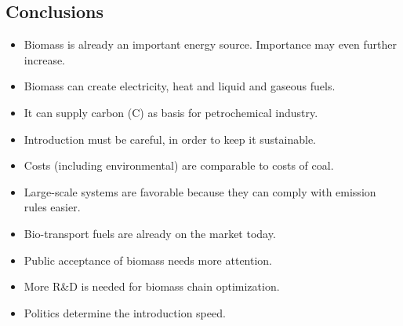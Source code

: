 \documentclass[a4paper,10pt]{article}
\begin{document}
\subsection{Conclusions}
\begin{itemize}
 \item Biomass is already an important energy source. Importance may even further increase.
 \item Biomass can create electricity, heat and liquid and gaseous fuels.
 \item It can supply carbon (C) as basis for petrochemical industry.
 \item Introduction must be careful, in order to keep it sustainable.
 \item Costs (including environmental) are comparable to costs of coal.
 \item Large-scale systems are favorable because they can comply with emission rules easier.
 \item Bio-transport fuels are already on the market today.
 \item Public acceptance of biomass needs more attention.
 \item More R\&D is needed for biomass chain optimization.
 \item Politics determine the introduction speed.
\end{itemize}
\end{document}
